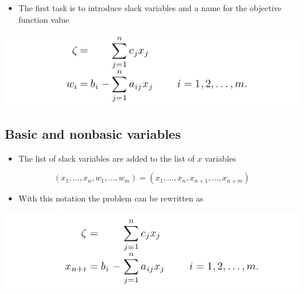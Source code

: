\documentclass[11pt]{article}
\begin{document}
\begin{itemize}
\item The first task is to introduce slack variables and a name for the objective function value
\end{itemize}
\begin{center}
\includegraphics[width=.9\linewidth]{The Simplex Method/screenshot_2019-01-28_08-53-05.png}
\end{center} 

\subsection{Basic and nonbasic variables}
\label{sec:org04f6f90}
\begin{itemize}
\item The list of slack variables are added to the list of \(x\) variables
\end{itemize}
\begin{equation}
  (x_1, \dots, x_n, w_1, \dots, w_m) = (x_1, \dots, x_n, x_{n+1}, \dots, x_{n+m})
\end{equation}
\begin{itemize}
\item With this notation the problem can be rewritten as
\end{itemize}
\begin{center}
\includegraphics[width=.9\linewidth]{The Simplex Method/screenshot_2019-01-28_08-58-57.png}
\end{center}  
\end{document}
